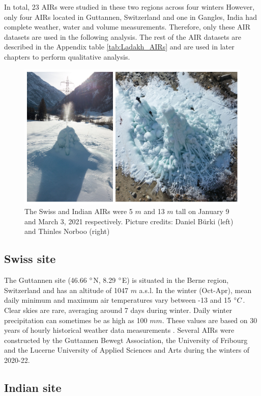 In total, 23 \ac{AIRs} were studied in these two regions across four winters  However, only four \ac{AIRs} located in
Guttannen, Switzerland and one in Gangles, India had complete weather, water and volume measurements. Therefore,
only these AIR datasets are used in the following analysis. The rest of the AIR datasets are described in the
Appendix table \ref{tab:Ladakh_AIRs} and are used in later chapters to perform qualitative analysis.

\begin{figure}[htb]
  \centering
	\includegraphics[width=12 cm]{figs/2AIRs.jpg}
  \caption{The Swiss and Indian \ac{AIRs} were 5 $m$ and 13 $m$ tall on January 9 and March 3, 2021 respectively. Picture
credits: Daniel Bürki (left) and Thinles Norboo (right)}
\label{fig:2AIRs}
\end{figure}

\subsection{Swiss site}

The Guttannen site (46.66 $^{\circ}$N, 8.29 $^{\circ}$E) is situated in the Berne region, Switzerland and has an
altitude of 1047 $m$ a.s.l. In the winter (Oct-Apr), mean daily minimum and maximum air temperatures vary
between -13 and 15 $^{\circ} C$. Clear skies are rare, averaging around 7 days during winter. Daily winter
precipitation can sometimes be as high as 100 $mm$. These values are based on 30 years of hourly historical
weather data measurements \citep{meteoblueClimateGuttannen2021}. Several \ac{AIRs} were constructed by the Guttannen
Bewegt Association, the University of Fribourg and the Lucerne University of Applied Sciences and Arts during
the winters of 2020-22.

\subsection{Indian site}

